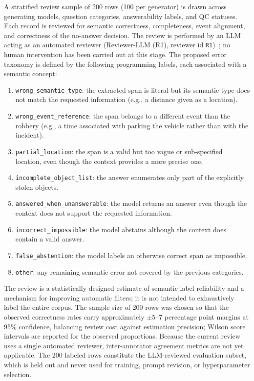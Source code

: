 \documentclass[graybox]{SNmult}
\begin{document}
A stratified review sample of 200 rows (100 per generator) is drawn across
generating models, question categories, answerability labels, and QC statuses.
Each record is reviewed for semantic correctness, completeness, event
alignment, and correctness of the no-answer decision. The review is performed
by an LLM acting as an automated reviewer (Reviewer-LLM (R1), reviewer
id \texttt{R1})~\cite{glm45_techreport,glm_reviewer_hf}; no human intervention has
been carried out at this stage. The proposed error taxonomy is defined by the
following programming labels, each associated with a semantic concept:
\begin{enumerate}
\item \texttt{wrong\_semantic\_type}: the extracted span is literal but its
  semantic type does not match the requested information (e.g., a distance
  given as a location).
\item \texttt{wrong\_event\_reference}: the span belongs to a different event
  than the robbery (e.g., a time associated with parking the vehicle rather
  than with the incident).
\item \texttt{partial\_location}: the span is a valid but too vague or
  sub-specified location, even though the context provides a more precise one.
\item \texttt{incomplete\_object\_list}: the answer enumerates only part of the
  explicitly stolen objects.
\item \texttt{answered\_when\_unanswerable}: the model returns an answer even
  though the context does not support the requested information.
\item \texttt{incorrect\_impossible}: the model abstains although the context
  does contain a valid answer.
\item \texttt{false\_abstention}: the model labels an otherwise correct span as
  impossible.
\item \texttt{other}: any remaining semantic error not covered by the previous
  categories.
\end{enumerate}

The review is a statistically designed estimate of semantic label reliability
and a mechanism for improving automatic filters; it is not intended to
exhaustively label the entire corpus. The sample size of 200 rows was chosen so
that the observed correctness rates carry approximately $\pm 5$--7 percentage
point margins at 95\% confidence, balancing review cost against estimation
precision; Wilson score intervals are reported for the observed proportions.
Because the current review uses a single automated reviewer, inter-annotator
agreement metrics are not yet applicable. The 200 labeled rows constitute the
LLM-reviewed evaluation subset, which is held out and never used for training,
prompt revision, or hyperparameter selection.
\end{document}
